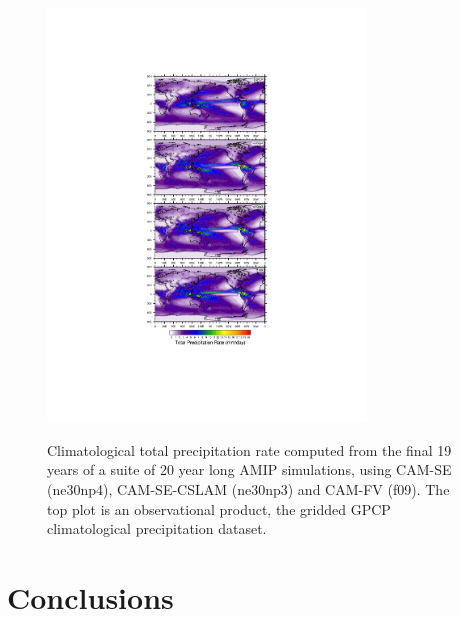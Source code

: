 \documentclass[twocol]{ametsoc}
\begin{document}
\begin{figure}[t]
\begin{center}
\noindent\includegraphics[width=20pc,angle=0]{figs/AMIP_global.pdf}\\
\end{center}
\caption{Climatological total precipitation rate computed from the final 19 years of a suite of 20 year long AMIP simulations, using CAM-SE (ne30np4), CAM-SE-CSLAM (ne30np3) and CAM-FV (f09). The top plot is an observational product, the gridded GPCP climatological precipitation dataset.}
\label{fig:AMIP-global}
\end{figure}

\section{Conclusions}\label{sec:conclusions}
\end{document}
